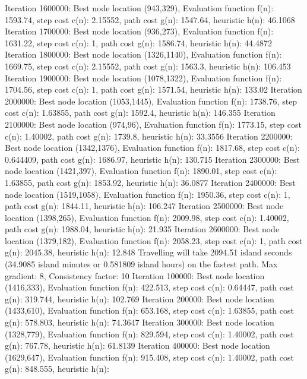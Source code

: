 \begin{DoxyCode}
Iteration 1600000: Best node location (943,329), 
     Evaluation function f(n): 1593.74, step cost c(n): 2.15552, path cost g(n): 1547.64, heuristic h(n):
       46.1068
Iteration 1700000: Best node location (936,273), 
     Evaluation function f(n): 1631.22, step cost c(n): 1, path cost g(n): 1586.74, heuristic h(n): 44.4872
Iteration 1800000: Best node location (1326,1140), 
     Evaluation function f(n): 1669.75, step cost c(n): 2.15552, path cost g(n): 1563.3, heuristic h(n):
       106.453
Iteration 1900000: Best node location (1078,1322), 
     Evaluation function f(n): 1704.56, step cost c(n): 1, path cost g(n): 1571.54, heuristic h(n): 133.02
Iteration 2000000: Best node location (1053,1445), 
     Evaluation function f(n): 1738.76, step cost c(n): 1.63855, path cost g(n): 1592.4, heuristic h(n):
       146.355
Iteration 2100000: Best node location (974,96), 
     Evaluation function f(n): 1773.15, step cost c(n): 1.40002, path cost g(n): 1739.8, heuristic h(n):
       33.3556
Iteration 2200000: Best node location (1342,1376), 
     Evaluation function f(n): 1817.68, step cost c(n): 0.644409, path cost g(n): 1686.97, heuristic h(n):
       130.715
Iteration 2300000: Best node location (1421,397), 
     Evaluation function f(n): 1890.01, step cost c(n): 1.63855, path cost g(n): 1853.92, heuristic h(n):
       36.0877
Iteration 2400000: Best node location (1519,1058), 
     Evaluation function f(n): 1950.36, step cost c(n): 1, path cost g(n): 1844.11, heuristic h(n): 106.247
Iteration 2500000: Best node location (1398,265), 
     Evaluation function f(n): 2009.98, step cost c(n): 1.40002, path cost g(n): 1988.04, heuristic h(n):
       21.935
Iteration 2600000: Best node location (1379,182), 
     Evaluation function f(n): 2058.23, step cost c(n): 1, path cost g(n): 2045.38, heuristic h(n): 12.848
Travelling will take 2094.51 island seconds (34.9085 island minutes or 0.581809 island hours) on the
       fastest path. 
Max gradient: 8, Consistency factor: 10
Iteration 100000: Best node location (1416,333), 
     Evaluation function f(n): 422.513, step cost c(n): 0.64447, path cost g(n): 319.744, heuristic h(n):
       102.769
Iteration 200000: Best node location (1433,610), 
     Evaluation function f(n): 653.168, step cost c(n): 1.63855, path cost g(n): 578.803, heuristic h(n):
       74.3647
Iteration 300000: Best node location (1328,779), 
     Evaluation function f(n): 829.594, step cost c(n): 1.40002, path cost g(n): 767.78, heuristic h(n):
       61.8139
Iteration 400000: Best node location (1629,647), 
     Evaluation function f(n): 915.408, step cost c(n): 1.40002, path cost g(n): 848.555, heuristic h(n):

\end{DoxyCode}
